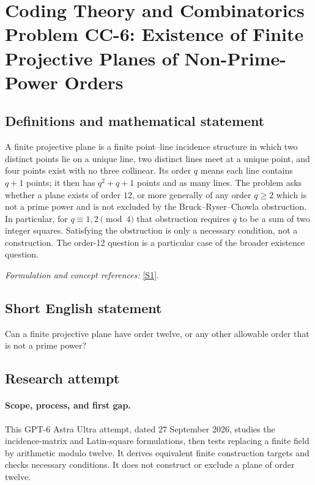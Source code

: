 \documentclass[11pt]{article}
\begin{document}
\section*{\texorpdfstring{Coding Theory and Combinatorics Problem CC-6: Existence of Finite Projective Planes of Non-Prime-Power Orders}{Coding Theory and Combinatorics Problem CC-6: Existence of Finite Projective Planes of Non-Prime-Power Orders}}\label{30006910}
\subsection{Definitions and mathematical statement}
A finite projective plane is a finite point--line incidence structure in which two distinct points lie on a unique line, two distinct lines meet at a unique point, and four points exist with no three collinear. Its order $q$ means each line contains $q+1$ points; it then has $q^2+q+1$ points and as many lines. The problem asks whether a plane exists of order $12$, or more generally of any order $q\ge2$ which is not a prime power and is not excluded by the Bruck--Ryser--Chowla obstruction. In particular, for $q\equiv1,2\pmod4$ that obstruction requires $q$ to be a sum of two integer squares. Satisfying the obstruction is only a necessary condition, not a construction. The order-12 question is a particular case of the broader existence question.
\par\smallskip\textit{Formulation and concept references:} \href{https://arxiv.org/pdf/0811.1254}{[S1]}.

\subsection{Short English statement}
Can a finite projective plane have order twelve, or any other allowable order that is not a prime power?
\subsection{Research attempt}
\paragraph{Scope, process, and first gap.}
This GPT-6 Astra Ultra attempt, dated 27 September 2026, studies the incidence-matrix and Latin-square formulations, then tests replacing a finite field by arithmetic modulo twelve. It derives equivalent finite construction targets and checks necessary conditions. It does not construct or exclude a plane of order twelve.
\end{document}

